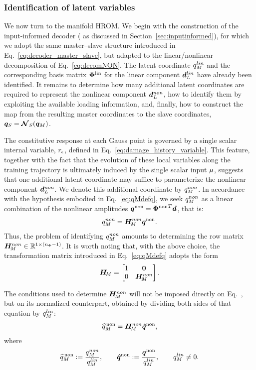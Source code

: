 \documentclass[preprint,10pt]{elsarticle}  %
\begin{document}
\subsubsection{Identification of latent variables}
\label{sec:id2}

We now turn to the manifold HROM. We begin with the construction of the input-informed
decoder ( as discussed in
Section~\ref{sec:inputinformed}), for which we adopt the same master--slave structure introduced
in Eq.~\ref{eq:decoder_master_slave}, but adapted to the linear/nonlinear
decomposition of Eq.~\ref{eq:decomNON}. The latent coordinate
\({q}_M^{lin}\) and the corresponding basis matrix \(\boldsymbol{\Phi}^{\mathrm{lin}}\) for the
linear component \(\bm{d}_L^{lin}\) have already been identified. It remains to determine how many
additional latent coordinates are required to represent the nonlinear
component \(\bm{d}_L^{non}\), how to identify them by exploiting the available
loading information, and, finally, how to construct the map from the
resulting master coordinates to the slave coordinates,
\(\bm{q}_{S}=\boldsymbol{\mathcal{N}}_{S}(\bm{q}_M)\).

The constitutive response at each Gauss point is governed by a single
scalar internal variable, \(r_{\epsilon}\), defined in
Eq.~\eqref{eq:damage_history_variable}. This feature, together with the
fact that the evolution of these local variables along the training
trajectory is ultimately induced by the single scalar input
\(\mu\), suggests that one additional latent coordinate may suffice
to parameterize the nonlinear component \(\bm{d}_L^{non}\). We denote this additional
coordinate by \({q}_M^{non}\). In accordance with the hypothesis embodied in Eq.~\ref{eq:qMdefq}, we seek ${q}_M^{non}$ as a linear combination of the
nonlinear amplitudes $\bm{q}^{\mathrm{non}} = {\boldsymbol{\Phi}^{\mathrm{non}}}^T \bm{d}$, that is:
\begin{equation}
\label{eq:TmNONdef}
 {q}_M^{non} = \bm{H}_{\!M}^{non} \bm{q}^{\mathrm{non}}.
\end{equation}
Thus, the problem of identifying ${q}_M^{non}$  amounts to determining the row matrix $\bm{H}_{\!M}^{non} \in \mathbb{R}^{1 \times (n_{\Phi}-1)}$. It is worth noting that, with the above choice, the transformation
matrix introduced in Eq.~\ref{eq:qMdefq} adopts the form
\begin{equation}
\bm{H}_{\!M} = \begin{bmatrix} 1 & \boldsymbol{0} \\ 0 & \bm{H}_{\!M}^{non} \end{bmatrix}.
\end{equation}
%


The conditions used to determine \(\bm{H}_{\!M}^{non}\) will not be imposed
directly on Eq.~, but on its normalized counterpart,
obtained by dividing both sides of that equation by \({q}_M^{lin}\):
\begin{equation}
\label{eq:TmNONdef2}
\widehat{q}^{\mathrm{\,non}}_{M} = \bm{H}_{\!M}^{non} \bm{\hat{q}}^{\mathrm{non}},
\end{equation}
where
\begin{equation}
\label{eq:ratiosdEF}
\widehat{q}^{\mathrm{\,non}}_{M} \mathrel{\mathop:}= \dfrac{{q}_M^{non}}{{q}_M^{lin}},
\qquad
\bm{\hat{q}}^{\mathrm{non}} \mathrel{\mathop:}= \dfrac{\bm{q}^{\mathrm{non}}}{{q}_M^{lin}},
\qquad
{q}_M^{lin} \neq 0.
\end{equation}
\end{document}
